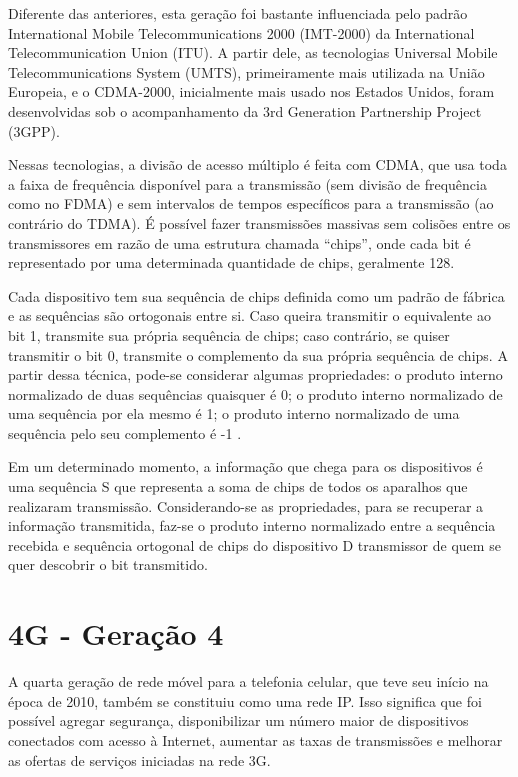 \documentclass[11pt,oneside,a4paper]{abntex2}
\begin{document}
Diferente das anteriores, esta geração foi bastante influenciada pelo padrão International Mobile Telecommunications 2000 (IMT-2000) da International Telecommunication Union (ITU). A partir dele, as tecnologias Universal Mobile Telecommunications System (UMTS), primeiramente mais utilizada na União Europeia, e o CDMA-2000, inicialmente mais usado nos Estados Unidos, foram desenvolvidas sob o acompanhamento da 3rd Generation Partnership Project (3GPP).

Nessas tecnologias, a divisão de acesso múltiplo é feita com CDMA, que usa toda a faixa de frequência disponível para a transmissão (sem divisão de frequência como no FDMA) e sem intervalos de tempos específicos para a transmissão (ao contrário do TDMA). É possível fazer transmissões massivas sem colisões entre os transmissores em razão de  uma estrutura chamada ``chips'', onde cada bit é representado por uma determinada quantidade de chips, geralmente 128.

Cada dispositivo tem sua sequência de chips definida como um padrão de fábrica e as sequências são ortogonais entre si. Caso queira transmitir o equivalente ao bit 1, transmite sua própria sequência de chips; caso contrário, se quiser transmitir o bit 0, transmite o complemento da sua própria sequência de chips. A partir dessa técnica, pode-se considerar algumas propriedades: o produto interno normalizado de duas sequências quaisquer é 0; o produto interno normalizado de uma sequência por ela mesmo é 1; o produto interno normalizado de uma sequência pelo seu complemento é -1 \cite{aula4}.

Em um determinado momento, a informação que chega para os dispositivos é uma sequência S que representa a soma de chips de todos os aparalhos que realizaram transmissão. Considerando-se as propriedades, para se recuperar a informação transmitida, faz-se o produto interno normalizado entre a sequência recebida e sequência ortogonal de chips do dispositivo D transmissor de quem se quer descobrir o bit transmitido.

\section*{4G - Geração 4}
\label{4g}

A quarta geração de rede móvel para a telefonia celular, que teve seu início na época de 2010, também se constituiu como uma rede IP. Isso significa que foi possível agregar segurança, disponibilizar um número maior de dispositivos conectados com acesso à Internet, aumentar as taxas de transmissões e melhorar as ofertas de serviços iniciadas na rede 3G.
\end{document}
